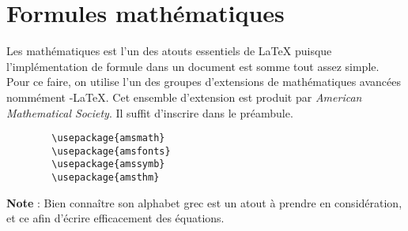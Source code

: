 	\section{Formules mathématiques}
	Les mathématiques est l'un des atouts essentiels de \LaTeX{} puisque l'implémentation de formule dans un document est somme tout assez simple. Pour ce faire, on utilise l'un des groupes d'extensions de mathématiques avancées nommément \AmS-\LaTeX. Cet ensemble d'extension est produit par \emph{American Mathematical Society}. Il suffit d'inscrire dans le préambule.
%
	\begin{verbatim}
		\usepackage{amsmath}
		\usepackage{amsfonts}
		\usepackage{amssymb}
		\usepackage{amsthm}
	\end{verbatim}
%
	\textbf{Note} : Bien connaître son alphabet grec est un atout à prendre en considération, et ce afin d'écrire efficacement des équations.%
%	
